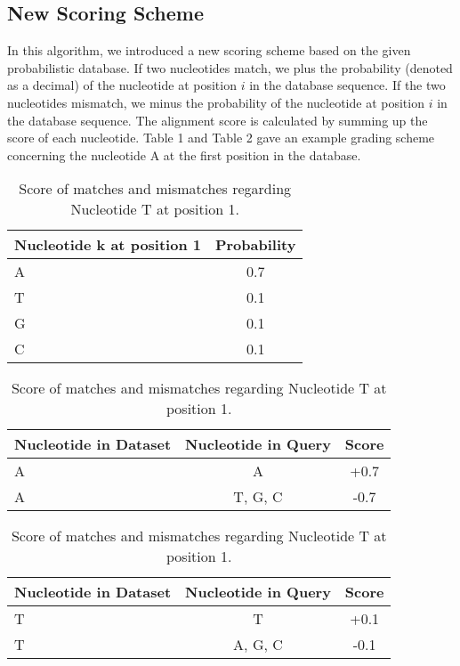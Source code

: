 \documentclass{article}
\begin{document}
\subsection*{New Scoring Scheme}
\label{sec:scoring}
In this algorithm, we introduced a new scoring scheme based on the given probabilistic database. If two nucleotides match, we plus the probability (denoted as a decimal) of the nucleotide at position $i$ in the database sequence. If the two nucleotides mismatch, we minus the probability of the nucleotide at position $i$ in the database sequence. The alignment score is calculated by summing up the score of each nucleotide. Table 1 and Table 2 gave an example grading scheme concerning the nucleotide A at the first position in the database.\\
\begin{table}[htbp!]
\centering

\begin{tabular}{|l|c|}
\hline
\textbf{Nucleotide k at position 1} & \textbf{Probability} \\ \hline
A & 0.7 \\ 
T & 0.1 \\ 
G & 0.1 \\ 
C & 0.1 \\ \hline
\end{tabular}
\caption{Probability of nucleotides at position 1.}
\label{tab:nucleotide_probability}
\bigskip


\begin{tabular}{|l|c|c|}
\hline
\textbf{Nucleotide in Dataset} & \textbf{Nucleotide in Query} & \textbf{Score} \\ \hline
A & A & +0.7 \\ 
A & T, G, C & -0.7 \\ \hline
\end{tabular}
\caption{Score of matches and mismatches regarding Nucleotide A at position 1.}
\label{tab:score_A}
\bigskip


\begin{tabular}{|l|c|c|}
\hline
\textbf{Nucleotide in Dataset} & \textbf{Nucleotide in Query} & \textbf{Score} \\ \hline
T & T & +0.1 \\ 
T & A, G, C & -0.1 \\ \hline
\end{tabular}
\caption{Score of matches and mismatches regarding Nucleotide T at position 1.}
\label{tab:score_T}
\end{table}
\end{document}
